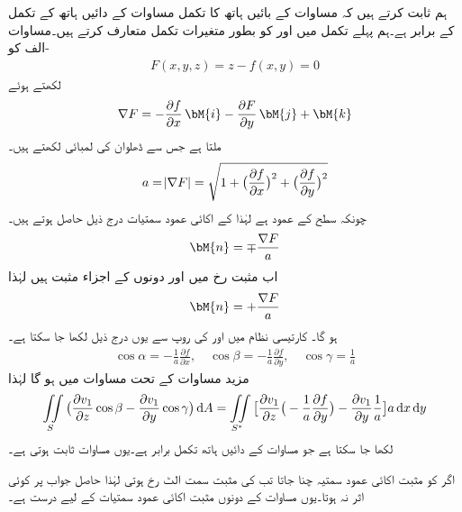 ہم ثابت کرتے ہیں کہ مساوات  کے بائیں ہاتھ کا تکمل مساوات  کے دائیں ہاتھ کے تکمل کے برابر ہے۔ہم پہلے تکمل میں  اور  کو بطور متغیرات تکمل متعارف کرتے ہیں۔مساوات -الف کو
\begin{align*}
F(x,y,z)=z-f(x,y)=0
\end{align*}
لکھتے ہوئے
\begin{align*}
\nabla F=-\frac{\partial f}{\partial x}\,\bM{i}-\frac{\partial F}{\partial y}\,\bM{j}+\bM{k}
\end{align*}
ملتا ہے جس سے ڈھلوان  کی لمبائی  لکھتے ہیں۔
\begin{align*}
a=\abs{\nabla F}=\sqrt{1+\big(\frac{\partial f}{\partial x}\big)^2+\big(\frac{\partial f}{\partial y}\big)^2}
\end{align*}
چونکہ  سطح  کے  عمود ہے لہٰذا   کے  اکائی عمود سمتیات  درج ذیل حاصل ہوتے ہیں۔
\begin{align*}
\bM{n}=\mp \frac{\nabla F}{a}
\end{align*}
اب مثبت  رخ میں  اور  دونوں کے اجزاء مثبت ہیں لہٰذا
\begin{align*}
\bM{n}=+ \frac{\nabla F}{a}
\end{align*}
ہو گا۔  کارتیسی نظام میں  اور  کی روپ سے یوں درج ذیل لکھا جا سکتا ہے۔
\begin{align*}
\cos \alpha=-\frac{1}{a}\frac{\partial f}{\partial x},\quad  \cos \beta=-\frac{1}{a}\frac{\partial f}{\partial y},\quad \cos \gamma=\frac{1}{a}
\end{align*}
مزید مساوات  کے تحت مساوات  میں  ہو گا لہٰذا
\begin{align*}
\iint\limits_S \big(\frac{\partial v_1}{\partial z}\cos \beta-\frac{\partial v_1}{\partial y}\cos \gamma\big)\dif A=\iint\limits_{S^*}\big[\frac{\partial v_1}{\partial z}\big(-\frac{1}{a}\frac{\partial f}{\partial y}\big)-\frac{\partial v_1}{\partial y}\frac{1}{a}\big]a\dif x\dif y
\end{align*}
لکھا جا سکتا ہے جو مساوات  کے دائیں ہاتھ تکمل برابر ہے۔یوں مساوات  ثابت ہوتی ہے۔

اگر  کو مثبت اکائی عمود سمتیہ چنا جاتا تب  کی مثبت سمت الٹ رخ ہوتی لہٰذا حاصل جواب پر کوئی اثر نہ ہوتا۔یوں مساوات   کے دونوں مثبت اکائی عمود  سمتیات کے لیے درست ہے۔

